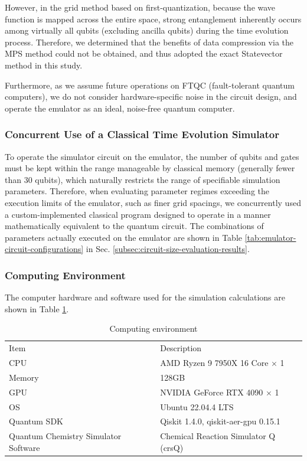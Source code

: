 \documentclass[aip-draft.tex]{subfiles}
\begin{document}
However, in the grid method based on first-quantization, because the wave
function is mapped across the entire space, strong entanglement inherently
occurs among virtually all qubits (excluding ancilla qubits) during the time
evolution process. Therefore, we determined that the benefits of data
compression via the MPS method could not be obtained, and thus adopted the exact
Statevector method in this study.

Furthermore, as we assume future operations on FTQC (fault-tolerant quantum
computers), we do not consider hardware-specific noise in the circuit design,
and operate the emulator as an ideal, noise-free quantum computer.

\subsubsection{Concurrent Use of a Classical Time Evolution Simulator}
To operate the simulator circuit on the emulator, the number of qubits and gates
must be kept within the range manageable by classical memory (generally fewer
than 30 qubits), which naturally restricts the range of specifiable simulation
parameters. Therefore, when evaluating parameter regimes exceeding the execution
limits of the emulator, such as finer grid spacings, we concurrently used a
custom-implemented classical program designed to operate in a manner
mathematically equivalent to the quantum circuit. The combinations of parameters
actually executed on the emulator are shown in Table
\ref{tab:emulator-circuit-configurations} in Sec.
\ref{subsec:circuit-size-evaluation-results}.

\subsubsection{Computing Environment}
The computer hardware and software used for the simulation calculations are
shown in Table \ref{tab:computing-environment}.

\begin{table}[ht]
    \centering
    \caption{Computing environment}
    \begin{ruledtabular}\begin{tabular}{ll}
        Item & Description \\
        \colrule
        CPU & AMD Ryzen 9 7950X 16 Core $\times$ 1 \\
        Memory & 128GB \\
        GPU & NVIDIA GeForce RTX 4090 $\times$ 1 \\
        OS & Ubuntu 22.04.4 LTS \\
        Quantum SDK & Qiskit 1.4.0, qiskit-aer-gpu 0.15.1 \\
        Quantum Chemistry Simulator Software & Chemical Reaction Simulator Q (crsQ) \cite{website:crsq}
    \end{tabular}\end{ruledtabular}
    \label{tab:computing-environment}
\end{table}
\end{document}
